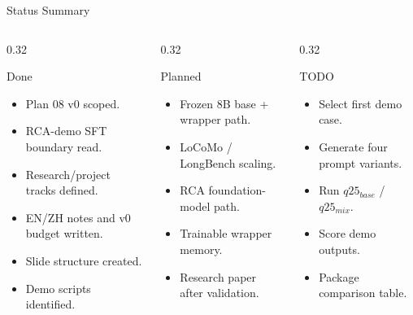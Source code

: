 \begin{frame}{Status Summary}
  \begin{columns}[T]
    \begin{column}{0.32\textwidth}
      \begin{block}{Done}
        \begin{itemize}
          \item Plan 08 v0 scoped.
          \item RCA-demo SFT boundary read.
          \item Research/project tracks defined.
          \item EN/ZH notes and v0 budget written.
          \item Slide structure created.
          \item Demo scripts identified.
        \end{itemize}
      \end{block}
    \end{column}
    \begin{column}{0.32\textwidth}
      \begin{block}{Planned}
        \begin{itemize}
          \item Frozen 8B base + wrapper path.
          \item LoCoMo / LongBench scaling.
          \item RCA foundation-model path.
          \item Trainable wrapper memory.
          \item Research paper after validation.
        \end{itemize}
      \end{block}
    \end{column}
    \begin{column}{0.32\textwidth}
      \begin{block}{TODO}
        \begin{itemize}
          \item Select first demo case.
          \item Generate four prompt variants.
          \item Run $q25_{base}$ / $q25_{mix}$.
          \item Score demo outputs.
          \item Package comparison table.
        \end{itemize}
      \end{block}
    \end{column}
  \end{columns}
\end{frame}


